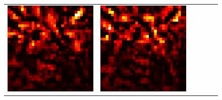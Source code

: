 \documentclass[preprint,12pt]{elsarticle}
\begin{document}
\begin{figure}[p]
\begin{tabular}{cccccc}
  \includegraphics[scale=\scale]{../visualizations/examples/cifar10/cnn/positive_saliency_map/5.png} & 
  \includegraphics[scale=\scale]{../visualizations/examples/cifar10/cnn/negative_saliency_map/5.png} & 

\end{tabular}
\end{figure}
\end{document}
